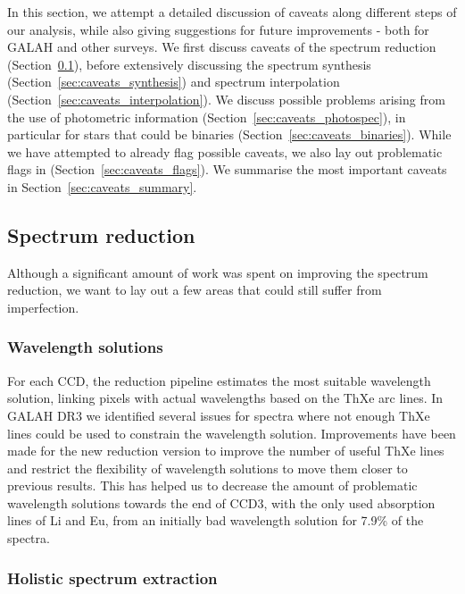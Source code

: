 \documentclass[
  journal=pasa,
  manuscript=research-paper, %
  year=2024,
  volume=37
]{cup-journal}
\begin{document}
In this section, we attempt a detailed discussion of caveats along different steps of our analysis, while also giving suggestions for future improvements - both for GALAH and other surveys. We first discuss caveats of the spectrum reduction (Section~\ref{sec:caveats_reduction}), before extensively discussing the spectrum synthesis (Section~\ref{sec:caveats_synthesis}) and spectrum interpolation (Section~\ref{sec:caveats_interpolation}). We discuss possible problems arising from the use of photometric information (Section~\ref{sec:caveats_photospec}), in particular for stars that could be binaries (Section~\ref{sec:caveats_binaries}). While we have attempted to already flag possible caveats, we also lay out problematic flags in (Section~\ref{sec:caveats_flags}). We summarise the most important caveats in Section~\ref{sec:caveats_summary}.

\subsection{Spectrum reduction}  \label{sec:caveats_reduction}

Although a significant amount of work was spent on improving the spectrum reduction, we want to lay out a few areas that could still suffer from imperfection.

\subsubsection{Wavelength solutions}

For each CCD, the reduction pipeline estimates the most suitable wavelength solution, linking pixels with actual wavelengths based on the ThXe arc lines. In GALAH DR3 \citep{Buder2021} we identified several issues for spectra where not enough ThXe lines could be used to constrain the wavelength solution. Improvements have been made for the new reduction version to improve the number of useful ThXe lines and restrict the flexibility of wavelength solutions to move them closer to previous results. This has helped us to decrease the amount of problematic wavelength solutions towards the end of CCD3, with the only used absorption lines of Li and Eu, from an initially bad wavelength solution for 7.9\% of the spectra.

\subsubsection{Holistic spectrum extraction}
\end{document}
